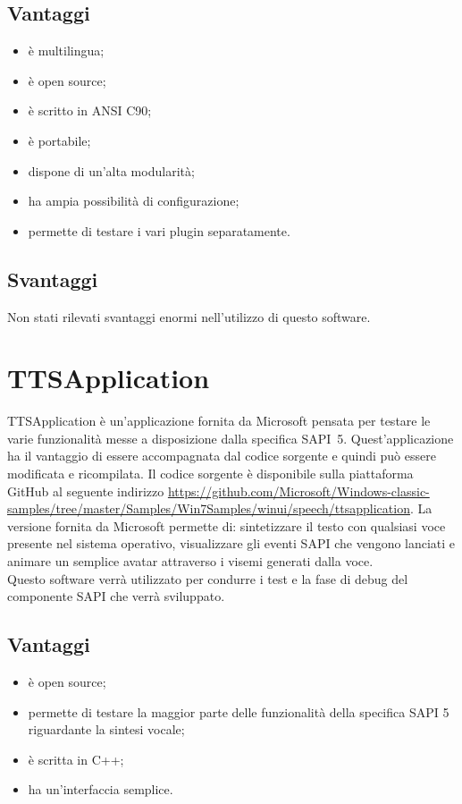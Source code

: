 \subsection*{Vantaggi}
\begin{itemize}
	\item è multilingua;
	\item è open source;
	\item è scritto in ANSI C90;
	\item è portabile;
	\item dispone di un'alta modularità;
	\item ha ampia possibilità di configurazione;
	\item permette di testare i vari plugin separatamente.
\end{itemize}
\subsection*{Svantaggi}
Non stati rilevati svantaggi enormi nell'utilizzo di questo software.   
\section{TTSApplication}
TTSApplication è un'applicazione fornita da Microsoft pensata per testare le varie funzionalità messe a disposizione dalla specifica SAPI~5. Quest'applicazione ha il vantaggio di essere accompagnata dal codice sorgente e quindi può essere modificata e ricompilata. Il codice sorgente è disponibile sulla piattaforma GitHub al seguente indirizzo \url{https://github.com/Microsoft/Windows-classic-samples/tree/master/Samples/Win7Samples/winui/speech/ttsapplication}.
La versione fornita da Microsoft permette di: sintetizzare il testo con qualsiasi voce presente nel sistema operativo, visualizzare gli eventi SAPI che vengono lanciati e animare un semplice avatar attraverso i visemi generati dalla voce.\\
Questo software verrà utilizzato per condurre i test e la fase di debug del componente SAPI che verrà sviluppato. 
\subsection*{Vantaggi}
\begin{itemize}
	\item è open source;
	\item permette di testare la maggior parte delle funzionalità della specifica SAPI 5 riguardante la sintesi vocale;
	\item è scritta in C++;
	\item ha un'interfaccia semplice.
\end{itemize}
